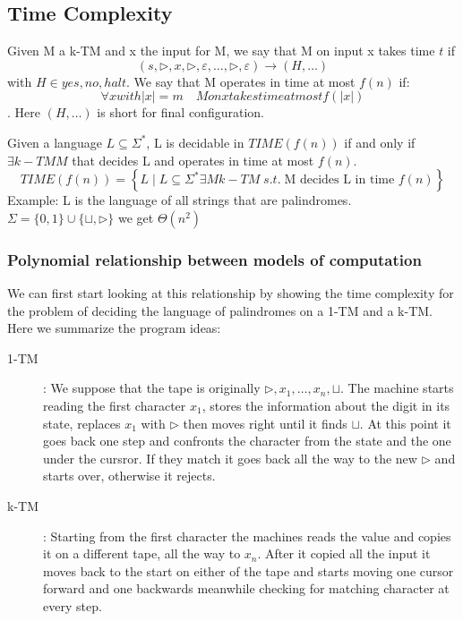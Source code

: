 \subsection*{Time Complexity}
\begin{definition}
    Given M a k-TM and x the input for M, we say that M on input x takes time $t$ if
    \[ 
        (s, \triangleright, x, \triangleright, \varepsilon, \ldots, \triangleright, \varepsilon) \longrightarrow ( H,\ldots) 
    \] 
    with $ H \in {yes, no, halt} $. We say that M operates in time at most $ f(n) $ if: \[ 
    \forall x with |x| = m \quad M on x takes time at most f(|x|) 
    \]. Here $( H,\ldots)$ is short for final configuration.
\end{definition}
\begin{definition}
    Given a language $L \subseteq \Sigma^*$, L is decidable in $ TIME(f(n))$ if and only if  $\exists k-TM M$ that decides L and operates in time at most $f(n)$.
    \[ 
        TIME(f(n)) = \left\{ L \mid L\subseteq \Sigma^* \exists M k-TM\; s.t. \; \text{M decides L in time } f(n) \right\} 
    \]
    Example: L is the language of all strings that are palindromes. $ \Sigma = \{0,1\}\cup\{\sqcup, \triangleright\} $ we get $ \Theta(n^2) $
\end{definition}
\subsubsection*{Polynomial relationship between models of computation}
We can first start looking at this relationship by showing the time complexity for the problem of deciding the language of palindromes on a 1-TM and a k-TM. Here we summarize the program ideas:
\begin{description}
    \item[1-TM]: We suppose that the tape is originally $\triangleright, x_{1}, \ldots,x_{n}, \sqcup$. The machine starts reading the first character $x_1$, stores the information about the digit in its state, replaces $x_1$ with $\triangleright$ then moves right until it finds $\sqcup$. At this point it goes back one step and confronts the character from the state and the one under the cursror. If they match it goes back all the way to the new $\triangleright$ and starts over, otherwise it rejects.
    \item[k-TM]: Starting from the first character the machines reads the value and copies it on a different tape, all the way to $x_n$. After it copied all the input it moves back to the start on either of the tape and starts moving one cursor forward and one backwards meanwhile checking for matching character at every step.
\end{description}

